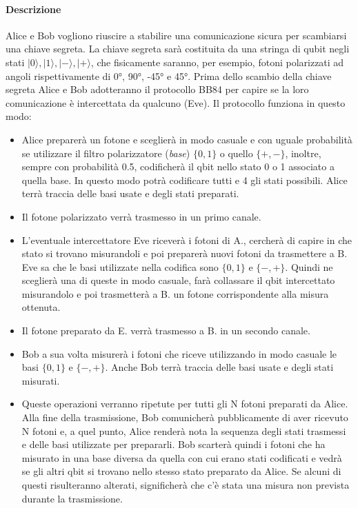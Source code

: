 \documentclass[11 pt, a4paper]{article}
\begin{document}
\paragraph{Descrizione}
Alice e Bob vogliono riuscire a stabilire una comunicazione sicura per scambiarsi una chiave segreta. La chiave segreta sarà costituita da una stringa di qubit negli stati $|0\rangle, |1\rangle, |-\rangle, |+\rangle$, che fisicamente saranno, per esempio, fotoni polarizzati ad angoli rispettivamente di 0°, 90°, -45° e 45°.
Prima dello scambio della chiave segreta Alice e Bob adotteranno il protocollo BB84 per capire se la loro comunicazione è intercettata da qualcuno (Eve). Il protocollo funziona in questo modo:
\begin{itemize}
    \item Alice preparerà un fotone e sceglierà in modo casuale e con uguale probabilità se utilizzare il filtro polarizzatore (\textit{base}) $\{0,1\}$ o quello $\{+,-\}$, inoltre, sempre con probabilità 0.5, codificherà il qbit nello stato 0 o 1 associato a quella base. In questo modo potrà codificare tutti e 4 gli stati possibili. Alice terrà traccia delle basi usate e degli stati preparati.
    \item Il fotone polarizzato verrà trasmesso in un primo canale.
    \item L'eventuale intercettatore Eve riceverà i fotoni di A., cercherà di capire in che stato si trovano misurandoli e poi preparerà nuovi fotoni da trasmettere a B. 
    Eve sa che le basi utilizzate nella codifica sono $\{0,1\}$ e $\{-,+\}$. Quindi ne sceglierà una di queste in modo casuale, farà collassare il qbit intercettato misurandolo e poi trasmetterà a B. un fotone corrispondente alla misura ottenuta.
    \item Il fotone preparato da E. verrà trasmesso a B. in un secondo canale.
    \item Bob a sua volta misurerà i fotoni che riceve utilizzando in modo casuale le basi $\{0,1\}$ e $\{-,+\}$. Anche Bob terrà traccia delle basi usate e degli stati misurati.
    \item Queste operazioni verranno ripetute per tutti gli N fotoni preparati da Alice. Alla fine della trasmissione, Bob comunicherà pubblicamente di aver ricevuto N fotoni e, a quel punto, Alice renderà nota la sequenza degli stati trasmessi e delle basi utilizzate per prepararli. Bob scarterà quindi i fotoni che ha misurato in una base diversa da quella con cui erano stati codificati e vedrà se gli altri qbit si trovano nello stesso stato preparato da Alice. Se alcuni di questi risulteranno alterati, significherà che c'è stata una misura non prevista durante la trasmissione.
\end{itemize}
\end{document}
